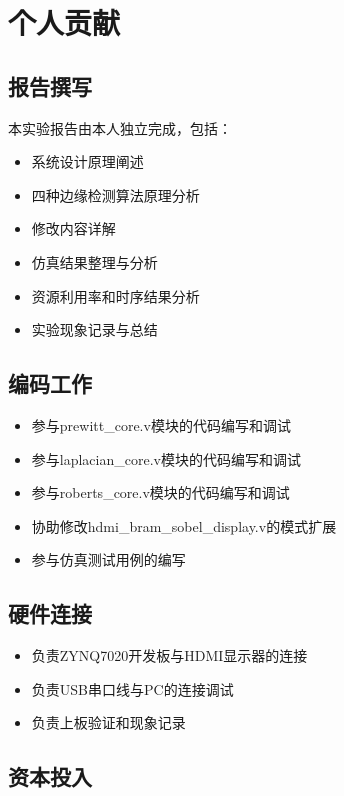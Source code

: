 
\section{个人贡献}


\subsection{报告撰写}

本实验报告由本人独立完成，包括：
\begin{itemize}
    \item 系统设计原理阐述
    \item 四种边缘检测算法原理分析
    \item 修改内容详解
    \item 仿真结果整理与分析
    \item 资源利用率和时序结果分析
    \item 实验现象记录与总结
\end{itemize}


\subsection{编码工作}

\begin{itemize}
    \item 参与prewitt\_core.v模块的代码编写和调试
    \item 参与laplacian\_core.v模块的代码编写和调试
    \item 参与roberts\_core.v模块的代码编写和调试
    \item 协助修改hdmi\_bram\_sobel\_display.v的模式扩展
    \item 参与仿真测试用例的编写
\end{itemize}

\subsection{硬件连接}

\begin{itemize}
    \item 负责ZYNQ7020开发板与HDMI显示器的连接
    \item 负责USB串口线与PC的连接调试
    \item 负责上板验证和现象记录
\end{itemize}

\subsection{资本投入}

